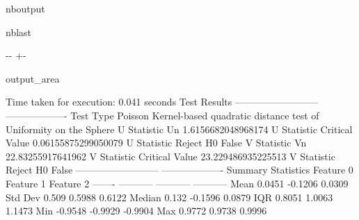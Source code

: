 \documentclass[letterpaper,10pt,english,openany,oneside]{sphinxmanual}
\begin{document}
\begin{sphinxuseclass}{nboutput}
\begin{sphinxuseclass}{nblast}
{

\kern-\sphinxverbatimsmallskipamount\kern-\baselineskip
\kern+\FrameHeightAdjust\kern-\fboxrule
\vspace{\nbsphinxcodecellspacing}

\begin{sphinxuseclass}{output_area}
\begin{sphinxuseclass}{}


\begin{sphinxVerbatim}[commandchars=\\\{\}]
Time taken for execution: 0.041 seconds
Test Results
--------------------------  -------------------
Test Type                   Poisson Kernel-based quadratic
 distance test of Uniformity on the Sphere
U Statistic Un              1.6156682048968174
U Statistic Critical Value  0.06155875299050079
U Statistic Reject H0       False
V Statistic Vn              22.83255917641962
V Statistic Critical Value  23.229486935225513
V Statistic Reject H0       False
--------------------------  -------------------
Summary Statistics
           Feature 0    Feature 1    Feature 2
-------  -----------  -----------  -----------
Mean          0.0451      -0.1206       0.0309
Std Dev       0.509        0.5988       0.6122
Median        0.132       -0.1596       0.0879
IQR           0.8051       1.0063       1.1473
Min          -0.9548      -0.9929      -0.9904
Max           0.9772       0.9738       0.9996
\end{sphinxVerbatim}



\end{sphinxuseclass}
\end{sphinxuseclass}
}

\end{sphinxuseclass}
\end{sphinxuseclass}
\end{document}
